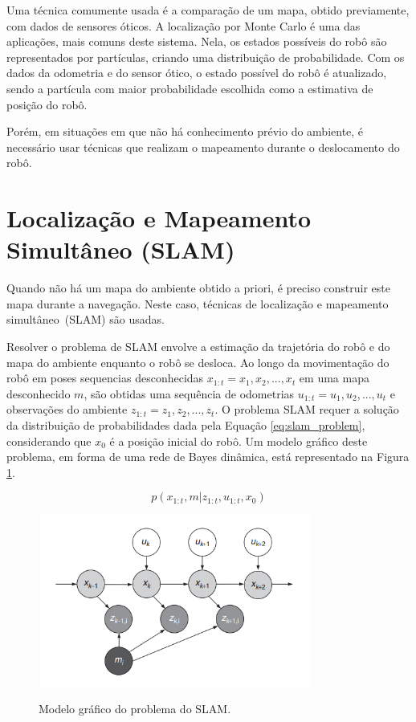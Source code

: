 \documentclass[repeatfields,xlists,xpacks,oneside,yearsonly]{ufrgscca}
\begin{document}
Uma técnica comumente usada é a comparação de um mapa, obtido
previamente, com dados de sensores óticos. A localização por Monte
Carlo é uma das aplicações, mais comuns deste sistema. Nela, os
estados possíveis do robô são representados por partículas, criando
uma distribuição de probabilidade. Com os dados da odometria e do
sensor ótico, o estado possível do robô é atualizado, sendo a
partícula com maior probabilidade escolhida como a estimativa de
posição do robô.

Porém, em situações em que não há conhecimento prévio do ambiente, é
necessário usar técnicas que realizam o mapeamento durante o
deslocamento do robô.

\section{Localização e Mapeamento Simultâneo (SLAM)}

Quando não há um mapa do ambiente obtido a priori, é preciso
construir este mapa durante a navegação. Neste caso, técnicas de
localização e mapeamento simultâneo~(SLAM) são usadas.

Resolver o problema de SLAM envolve a estimação da trajetória do robô
e do mapa do ambiente enquanto o robô se desloca. Ao longo da
movimentação do robô em poses sequencias desconhecidas $x_{1:t} = {
            x_1, x_2, ..., x_t }$ em uma mapa desconhecido $m$, são obtidas uma
sequência de odometrias $u_{1:t} = {u_1, u_2, ..., u_t}$ e
observações do ambiente $z_{1:t} = {z_1, z_2, ..., z_t}$. O problema
SLAM requer a solução da distribuição de probabilidades dada pela
Equação \ref{eq:slam_problem}, considerando que $x_0$ é a posição
inicial do robô. Um modelo gráfico deste problema, em forma de uma
rede de Bayes dinâmica, está representado na Figura
\ref{fig:slam_algo}.

\begin{equation}
    \label{eq:slam_problem}
    p(x_{1:t}, m | z_{1:t}, u_{1:t}, x_0)
\end{equation}

\begin{figure}[h]
    {
        \centering
        \caption{Modelo gráfico do problema do SLAM.}
        \label{fig:slam_algo}
        \includegraphics[width=0.8\textwidth]{graphic_slam_representation.png}\\
    }
    {}
\end{figure}
\end{document}

